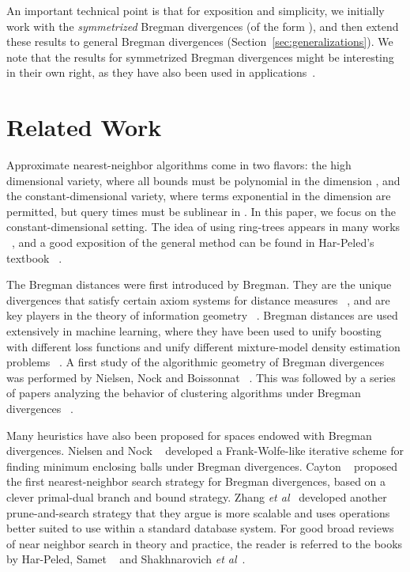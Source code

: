 \documentclass[11pt]{myclass}
\newcommand{\etal}{\emph{et al}\xspace}
\begin{document}
An important technical point is that for exposition and simplicity, we initially work with 
the \emph{symmetrized} Bregman divergences (of the form ), 
and then  extend these results to general Bregman divergences (Section~\ref{sec:generalizations}).
 We note that the results for symmetrized Bregman divergences might be interesting in their own right, 
as they have also been used in applications~\cite{vptrees,tailoredbregmannn,symmetrizedcentroids,moresymmetrizedcentroids}.



 

\section{Related Work}
\label{sec:related}


Approximate nearest-neighbor algorithms come in two flavors: the high dimensional variety, where all bounds must be polynomial in the dimension , and the constant-dimensional variety, where terms exponential in the dimension are permitted, but query times must be sublinear in . In this paper, we focus on the constant-dimensional setting. The idea of using ring-trees appears in many works ~\cite{indykmotwani,blackbox,peledmendel}, and a good exposition of the general method can be found in Har-Peled's textbook ~\cite[Chapter 11]{snotes}. 

The Bregman distances were first introduced by Bregman\cite{bregman}. They are the unique divergences that satisfy certain axiom systems for distance measures ~\cite{csiszar}, and are key players in the theory of information geometry ~\cite{amari}. Bregman distances are used extensively in machine learning, where they have been used to unify boosting with different loss functions\cite{collins2002logistic} and unify different mixture-model density estimation problems ~\cite{dhillon}. A first study of the algorithmic geometry of Bregman divergences was performed by Nielsen, Nock and Boissonnat ~\cite{bvd}. This was followed by a series of papers analyzing the behavior of clustering algorithms under Bregman divergences ~\cite{musimilarcoresets,ackermann2, ackermann3,roglin1,mcgregor}. 

Many heuristics have also been proposed for spaces endowed with Bregman divergences. Nielsen and Nock ~\cite{nsmallestdisk} developed a Frank-Wolfe-like iterative scheme for finding minimum enclosing balls under Bregman divergences. Cayton ~\cite{caytonpaper} proposed the first nearest-neighbor search strategy for Bregman divergences, based on a clever primal-dual branch and bound strategy. Zhang \etal ~\cite{bregsearch} developed another prune-and-search strategy that they argue is more scalable and uses operations better suited to use within a standard database system. 
For good broad reviews of near neighbor search in theory and practice, the reader is referred to the books by Har-Peled\cite{snotes}, Samet ~\cite{samet} and Shakhnarovich \etal ~\cite{nnbook}.
\end{document}

